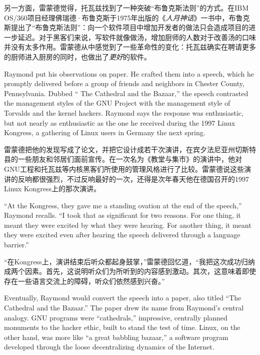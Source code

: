 \ifdefined\chs
另一方面，雷蒙德觉得，托瓦兹找到了一种突破``布鲁克斯法则''的方式。在IBM OS/360项目经理佛瑞德·布鲁克斯于1975年出版的《\textit{人月神话}》一书中，布鲁克斯提出了``布鲁克斯法则''：向一个软件项目中增加开发者的做法只会造成项目的进一步延迟。对于黑客们来说，写软件就像做汤，增加厨师的人数对于改善汤的口味并没有太多作用。雷蒙德从中感觉到了一些革命性的变化：托瓦兹确实在聘请更多的厨师进入厨房的同时，也做出了\textit{更好}的软件。
\fi

\ifdefined\eng
Raymond put his observations on paper. He crafted them into a speech, which he promptly delivered before a group of friends and neighbors in Chester County, Pennsylvania. Dubbed `` The Cathedral and the Bazaar,'' the speech contrasted the management styles of the GNU Project with the management style of Torvalds and the kernel hackers. Raymond says the response was enthusiastic, but not nearly as enthusiastic as the one he received during the 1997 Linux Kongress, a gathering of Linux users in Germany the next spring.
\fi

\ifdefined\chs
雷蒙德把他的发现写成了论文，并把它设计成若干次演讲，在宾夕法尼亚州切斯特县的一些朋友和邻居们面前宣传。在一次名为《教堂与集市》的演讲中，他对GNU工程和托瓦兹等内核黑客们所使用的管理风格进行了比较。雷蒙德说这些演讲的反响都很强烈，不过反响最好的一次，还得是次年春天他在德国召开的1997 Linux Kongress上的那次演讲。
\fi

\ifdefined\eng
``At the Kongress, they gave me a standing ovation at the end of the speech,'' Raymond recalls. ``I took that as significant for two reasons. For one thing, it meant they were excited by what they were hearing. For another thing, it meant they were excited even after hearing the speech delivered through a language barrier.''
\fi

\ifdefined\chs
``在Kongress上，演讲结束后听众都起身鼓掌，''雷蒙德回忆道，``我把这次成功归纳成两个因素。首先，这说明听众们为所听到的内容感到激动。其次，这意味着即使存在一些语言交流上的障碍，听众们依然感到兴奋。''
\fi

\ifdefined\eng
Eventually, Raymond would convert the speech into a paper, also titled ``The Cathedral and the Bazaar.'' The paper drew its name from Raymond's central analogy. GNU programs were ``cathedrals,'' impressive, centrally planned monuments to the hacker ethic, built to stand the test of time. Linux, on the other hand, was more like ``a great babbling bazaar,'' a software program developed through the loose decentralizing dynamics of the Internet.
\fi


